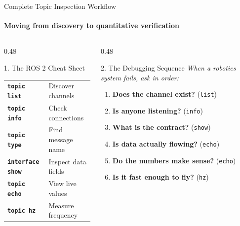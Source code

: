\begin{frame}{Complete Topic Inspection Workflow}
\framesubtitle{Moving from discovery to quantitative verification}

\footnotesize

\begin{columns}[T,onlytextwidth]

    \begin{column}{0.48\textwidth}
        \begin{block}{1. The ROS 2 Cheat Sheet}
            \renewcommand{\arraystretch}{1.35} %
            \begin{tabular}{l l}
                \textbf{\texttt{topic list}} & Discover channels \\
                \textbf{\texttt{topic info}} & Check connections \\
                \textbf{\texttt{topic type}} & Find message name \\
                \textbf{\texttt{interface show}} & Inspect data fields \\
                \textbf{\texttt{topic echo}} & View live values \\
                \textbf{\texttt{topic hz}} & Measure frequency \\
            \end{tabular}
        \end{block}
    \end{column}

    \begin{column}{0.48\textwidth}
        \pause
        \begin{exampleblock}{2. The Debugging Sequence}
            \textit{When a robotics system fails, ask in order:}
            \begin{enumerate}
                \setlength{\itemsep}{0.25em}
                \item \textbf{Does the channel exist?} (\texttt{list})
                \item \textbf{Is anyone listening?} (\texttt{info})
                \item \textbf{What is the contract?} (\texttt{show})
                \item \textbf{Is data actually flowing?} (\texttt{echo})
                \item \textbf{Do the numbers make sense?} (\texttt{echo})
                \item \textbf{Is it fast enough to fly?} (\texttt{hz})
            \end{enumerate}
        \end{exampleblock}
    \end{column}


\end{columns}
\end{frame}
